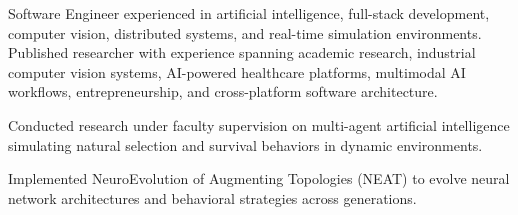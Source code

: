 \documentclass{../../../Styles/MS-Style}
\begin{document}
\begin{center}

\end{center}

\begin{Form}


	\normalsize{
		Software Engineer experienced in artificial intelligence, full-stack development,
		computer vision, distributed systems, and real-time simulation environments.
		Published researcher with experience spanning academic research, industrial
		computer vision systems, AI-powered healthcare platforms, multimodal AI
		workflows, entrepreneurship, and cross-platform software architecture.
	}









	\begin{listBlock}

		\generalItem
		Conducted research under faculty supervision on multi-agent artificial intelligence
		simulating natural selection and survival behaviors in dynamic environments.\cite{TagResearchRecommendation}

		\generalItem
		Implemented NeuroEvolution of Augmenting Topologies (NEAT) to evolve neural network architectures
		and behavioral strategies across generations.


\end{listBlock}
\end{Form}
\end{document}
